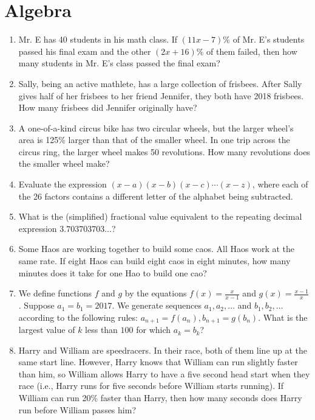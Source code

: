 \documentclass[11pt]{article}
\begin{document}
	\section{Algebra}
		\begin{enumerate}[1.]
			\item Mr. E has 40 students in his math class. If $\left(11x - 7\right)$\% of Mr. E's students passed his final exam and the other $\left(2x + 16\right)$\% of them failed, then how many students in Mr. E's class passed the final exam?
			
			\item Sally, being an active mathlete, has a large collection of frisbees. After Sally gives half of her frisbees to her friend Jennifer, they both have 2018 frisbees. How many frisbees did Jennifer originally have?
			
			\item A one-of-a-kind circus bike has two circular wheels, but the larger wheel's area is 125\% larger than that of the smaller wheel. In one trip across the circus ring, the larger wheel makes 50 revolutions. How many revolutions does the smaller wheel make?
			
			\item Evaluate the expression $(x - a)(x - b)(x - c)\cdots(x - z)$, where each of the 26 factors contains a different letter of the alphabet being subtracted.
			
			\item What is the (simplified) fractional value equivalent to the repeating decimal expression $3.703703703\ldots$?
			
			\item Some Haos are working together to build some caos. All Haos work at the same rate. If eight Haos can build eight caos in eight minutes, how many minutes does it take for one Hao to build one cao?
			
			\item We define functions $f$ and $g$ by the equations $f(x) = \frac{x}{x - 1}$ and $g(x) = \frac{x - 1}{x}$. Suppose $a_1 = b_1 = 2017$. We generate sequences $a_1, a_2, \ldots$ and $b_1, b_2, \ldots$ according to the following rules: $a_{n+1} = f\left(a_n\right), b_{n+1} = g\left(b_n\right)$. What is the largest value of $k$ less than $100$ for which $a_k = b_k$? 
			
			\item Harry and William are speedracers. In their race, both of them line up at the same start line. However, Harry knows that William can run slightly faster than him, so William allows Harry to have a five second head start when they race (i.e., Harry runs for five seconds before William starts running). If William can run 20\% faster than Harry, then how many seconds does Harry run before William passes him?
			

\end{enumerate}
\end{document}
